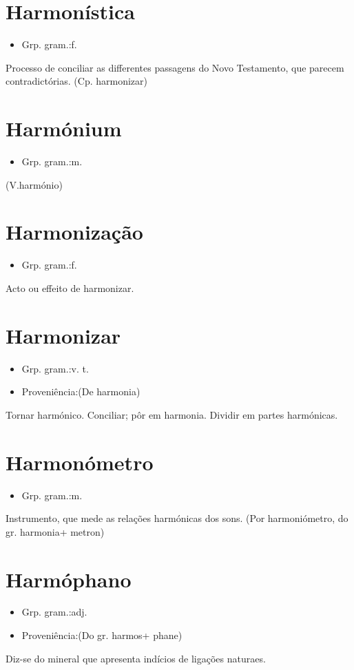 \documentclass{article}
\begin{document}
\section{Harmonística}
\begin{itemize}
\item {Grp. gram.:f.}
\end{itemize}
Processo de conciliar as differentes passagens do \textunderscore Novo Testamento\textunderscore , que parecem contradictórias.
(Cp. \textunderscore harmonizar\textunderscore )
\section{Harmónium}
\begin{itemize}
\item {Grp. gram.:m.}
\end{itemize}
(V.harmónio)
\section{Harmonização}
\begin{itemize}
\item {Grp. gram.:f.}
\end{itemize}
Acto ou effeito de harmonizar.
\section{Harmonizar}
\begin{itemize}
\item {Grp. gram.:v. t.}
\end{itemize}
\begin{itemize}
\item {Proveniência:(De \textunderscore harmonia\textunderscore )}
\end{itemize}
Tornar harmónico.
Conciliar; pôr em harmonia.
Dividir em partes harmónicas.
\section{Harmonómetro}
\begin{itemize}
\item {Grp. gram.:m.}
\end{itemize}
Instrumento, que mede as relações harmónicas dos sons.
(Por \textunderscore harmoniómetro\textunderscore , do gr. \textunderscore harmonia\textunderscore  + \textunderscore metron\textunderscore )
\section{Harmóphano}
\begin{itemize}
\item {Grp. gram.:adj.}
\end{itemize}
\begin{itemize}
\item {Proveniência:(Do gr. \textunderscore harmos\textunderscore  + \textunderscore phane\textunderscore )}
\end{itemize}
Diz-se do mineral que apresenta indícios de ligações naturaes.
\end{document}
